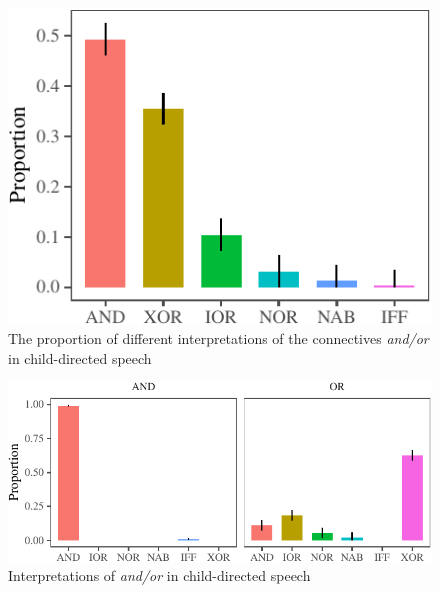 \documentclass[floatsintext,man]{apa6}
\theoremstyle{definition}
\theoremstyle{definition}
\theoremstyle{definition}
\theoremstyle{remark}
\begin{document}
\begin{figure}[tb]

{\centering \includegraphics{figs/interpretationPlot-1} 

}

\caption{The proportion of different interpretations of the connectives \textit{and/or} in child-directed speech}\label{fig:interpretationPlot}
\end{figure}

\begin{figure}[tb]

{\centering \includegraphics{figs/connectivePlot-1} 

}

\caption{Interpretations of \textit{and/or} in child-directed speech}\label{fig:connectivePlot}
\end{figure}
\end{document}
